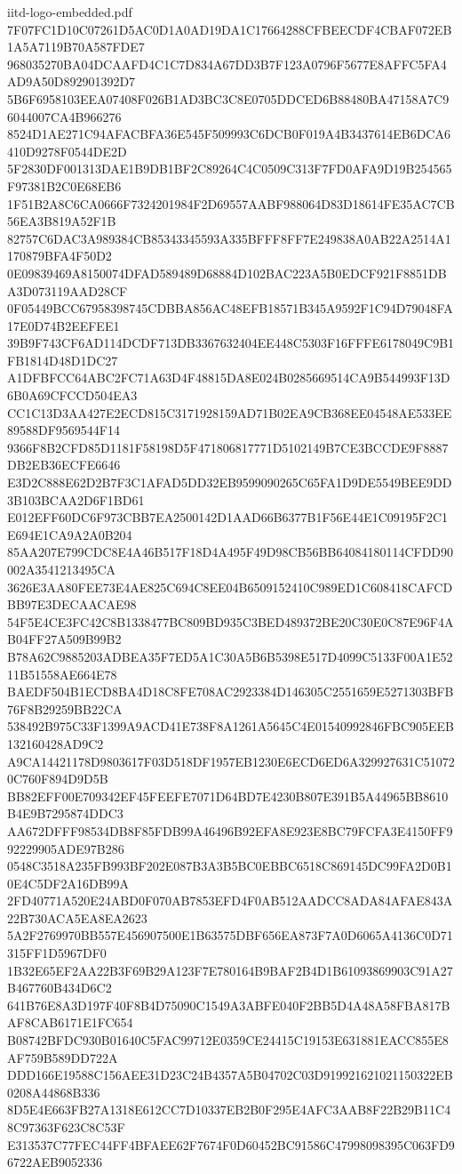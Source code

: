 \begin{filecontents*}[overwrite]{iitd-logo-embedded.pdf}
7F07FC1D10C07261D5AC0D1A0AD19DA1C17664288CFBEECDF4CBAF072EB1A5A7119B70A587FDE7
968035270BA04DCAAFD4C1C7D834A67DD3B7F123A0796F5677E8AFFC5FA4AD9A50D892901392D7
5B6F6958103EEA07408F026B1AD3BC3C8E0705DDCED6B88480BA47158A7C96044007CA4B966276
8524D1AE271C94AFACBFA36E545F509993C6DCB0F019A4B3437614EB6DCA6410D9278F0544DE2D
5F2830DF001313DAE1B9DB1BF2C89264C4C0509C313F7FD0AFA9D19B254565F97381B2C0E68EB6
1F51B2A8C6CA0666F7324201984F2D69557AABF988064D83D18614FE35AC7CB56EA3B819A52F1B
82757C6DAC3A989384CB85343345593A335BFFF8FF7E249838A0AB22A2514A1170879BFA4F50D2
0E09839469A8150074DFAD589489D68884D102BAC223A5B0EDCF921F8851DBA3D073119AAD28CF
0F05449BCC67958398745CDBBA856AC48EFB18571B345A9592F1C94D79048FA17E0D74B2EEFEE1
39B9F743CF6AD114DCDF713DB3367632404EE448C5303F16FFFE6178049C9B1FB1814D48D1DC27
A1DFBFCC64ABC2FC71A63D4F48815DA8E024B0285669514CA9B544993F13D6B0A69CFCCD504EA3
CC1C13D3AA427E2ECD815C3171928159AD71B02EA9CB368EE04548AE533EE89588DF9569544F14
9366F8B2CFD85D1181F58198D5F471806817771D5102149B7CE3BCCDE9F8887DB2EB36ECFE6646
E3D2C888E62D2B7F3C1AFAD5DD32EB9599090265C65FA1D9DE5549BEE9DD3B103BCAA2D6F1BD61
E012EFF60DC6F973CBB7EA2500142D1AAD66B6377B1F56E44E1C09195F2C1E694E1CA9A2A0B204
85AA207E799CDC8E4A46B517F18D4A495F49D98CB56BB64084180114CFDD90002A3541213495CA
3626E3AA80FEE73E4AE825C694C8EE04B6509152410C989ED1C608418CAFCDBB97E3DECAACAE98
54F5E4CE3FC42C8B1338477BC809BD935C3BED489372BE20C30E0C87E96F4AB04FF27A509B99B2
B78A62C9885203ADBEA35F7ED5A1C30A5B6B5398E517D4099C5133F00A1E5211B51558AE664E78
BAEDF504B1ECD8BA4D18C8FE708AC2923384D146305C2551659E5271303BFB76F8B29259BB22CA
538492B975C33F1399A9ACD41E738F8A1261A5645C4E01540992846FBC905EEB132160428AD9C2
A9CA14421178D9803617F03D518DF1957EB1230E6ECD6ED6A329927631C510720C760F894D9D5B
BB82EFF00E709342EF45FEEFE7071D64BD7E4230B807E391B5A44965BB8610B4E9B7295874DDC3
AA672DFFF98534DB8F85FDB99A46496B92EFA8E923E8BC79FCFA3E4150FF992229905ADE97B286
0548C3518A235FB993BF202E087B3A3B5BC0EBBC6518C869145DC99FA2D0B10E4C5DF2A16DB99A
2FD40771A520E24ABD0F070AB7853EFD4F0AB512AADCC8ADA84AFAE843A22B730ACA5EA8EA2623
5A2F2769970BB557E456907500E1B63575DBF656EA873F7A0D6065A4136C0D71315FF1D5967DF0
1B32E65EF2AA22B3F69B29A123F7E780164B9BAF2B4D1B61093869903C91A27B467760B434D6C2
641B76E8A3D197F40F8B4D75090C1549A3ABFE040F2BB5D4A48A58FBA817BAF8CAB6171E1FC654
B08742BFDC930B01640C5FAC99712E0359CE24415C19153E631881EACC855E8AF759B589DD722A
DDD166E19588C156AEE31D23C24B4357A5B04702C03D919921621021150322EB0208A44868B336
8D5E4E663FB27A1318E612CC7D10337EB2B0F295E4AFC3AAB8F22B29B11C48C97363F623C8C53F
E313537C77FEC44FF4BFAEE62F7674F0D60452BC91586C47998098395C063FD96722AEB9052336

\end{filecontents*}
